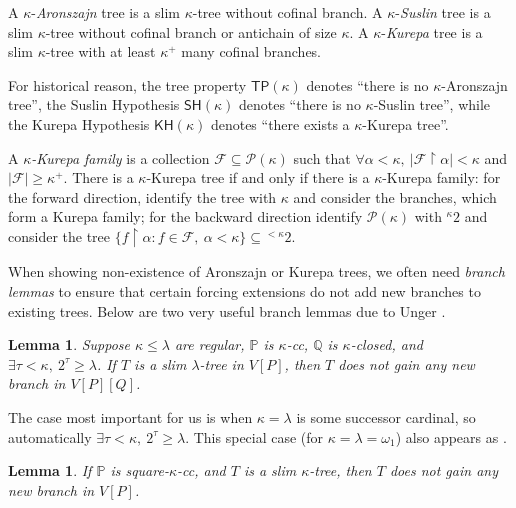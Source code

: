 \documentclass[10pt,reqno]{amsart}
\theoremstyle{plain}
\newtheorem{lemma}[theorem]{Lemma}
\theoremstyle{definition}
\theoremstyle{remark}
\begin{document}
A $\kappa$-\textit{Aronszajn} tree is a slim $\kappa$-tree without cofinal branch. A $\kappa$-\textit{Suslin} tree is a slim $\kappa$-tree without cofinal branch or antichain of size $\kappa$. A $\kappa$-\textit{Kurepa} tree is a slim $\kappa$-tree with at least $\kappa^+$ many cofinal branches.

For historical reason, the tree property $\mathsf{TP}(\kappa)$ denotes ``there is no $\kappa$-Aronszajn tree'', the Suslin Hypothesis $\mathsf{SH}(\kappa)$ denotes ``there is no $\kappa$-Suslin tree'', while the Kurepa Hypothesis $\mathsf{KH}(\kappa)$ denotes ``there exists a $\kappa$-Kurepa tree''.

A \textit{$\kappa$-Kurepa family} is a collection $\mathcal{F}\subseteq\mathcal{P}(\kappa)$ such that $\forall\alpha<\kappa,\ |\mathcal{F}\upharpoonright\alpha|<\kappa$ and $|\mathcal{F}|\geq\kappa^+$. There is a $\kappa$-Kurepa tree if and only if there is a $\kappa$-Kurepa family: for the forward direction, identify the tree with $\kappa$ and consider the branches, which form a Kurepa family; for the backward direction identify $\mathcal{P}(\kappa)$ with ${}^{\kappa}2$ and consider the tree $\{f\upharpoonright\alpha:f\in\mathcal{F},\ \alpha<\kappa\}\subseteq{}^{<\kappa}2$.


When showing non-existence of Aronszajn or Kurepa trees, we often need \textit{branch lemmas} to ensure that certain forcing extensions do not add new branches to existing trees. Below are two very useful branch lemmas due to Unger \cite{unger2012fragility,unger2015fragility}.

\begin{lemma}\label{forcing_branch_Unger_formerly_closed}
Suppose $\kappa\leq\lambda$ are regular, $\mathbb{P}$ is $\kappa$-cc, $\mathbb{Q}$ is $\kappa$-closed, and $\exists\tau<\kappa,\ 2^\tau\geq\lambda$. If $T$ is a slim $\lambda$-tree in $V[P]$, then $T$ does not gain any new branch in $V[P][Q]$.
\end{lemma}

The case most important for us is when $\kappa=\lambda$ is some successor cardinal, so automatically $\exists\tau<\kappa,\ 2^\tau\geq\lambda$. This special case (for $\kappa=\lambda=\omega_1$) also appears as \cite[Lemma 9]{devlin1973kurepa}.

\begin{lemma}\label{forcing_branch_Unger_square-cc}
If $\mathbb{P}$ is square-$\kappa$-cc, and $T$ is a slim $\kappa$-tree, then $T$ does not gain any new branch in $V[P]$.
\end{lemma}
\end{document}
